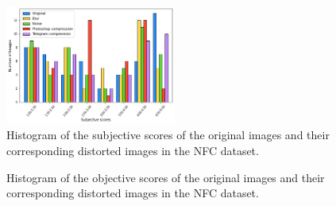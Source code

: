 \begin{figure}[h]
    \centering
    \includegraphics[width=0.5\textwidth]{figures/NFC_HistogramSUB.png}
    \caption{Histogram of the subjective scores of the original images and their corresponding distorted images in the NFC dataset.}
    \label{fig:NFC2HistogramSUB}
\end{figure}

\begin{figure}[h]
\centering
    \caption{Histogram of the objective scores of the original images and their corresponding distorted images in the NFC dataset.}
    \label{fig:NFC2Histogram}
\end{figure}

